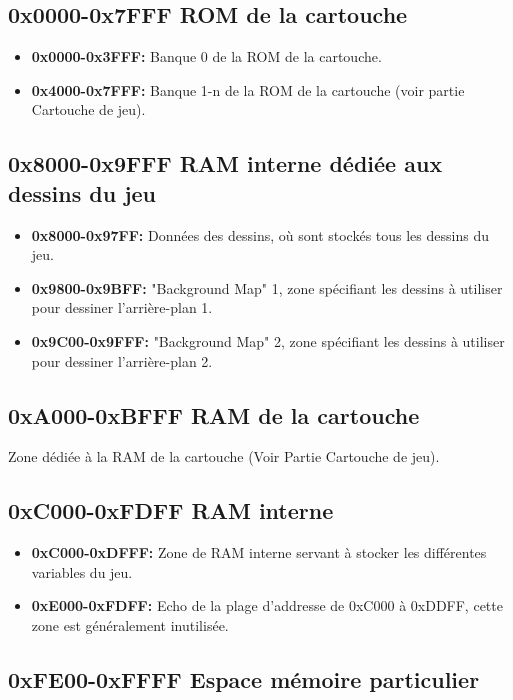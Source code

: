 \documentclass{report}
\begin{document}
\subsection{0x0000-0x7FFF ROM de la cartouche}
\begin{itemize}
\item \textbf{0x0000-0x3FFF:} Banque 0 de la ROM de la cartouche.
\item \textbf{0x4000-0x7FFF:} Banque 1-n de la ROM de la cartouche (voir partie Cartouche de jeu).
\end{itemize}

\subsection{0x8000-0x9FFF RAM interne dédiée aux dessins du jeu}
\begin{itemize}
\item \textbf{0x8000-0x97FF:} Données des dessins, où sont stockés tous les dessins du jeu.
\item \textbf{0x9800-0x9BFF:} "Background Map" 1, zone spécifiant les dessins à utiliser pour dessiner l'arrière-plan 1.
\item \textbf{0x9C00-0x9FFF:} "Background Map" 2, zone spécifiant les dessins à utiliser pour dessiner l'arrière-plan 2. 
\end{itemize} 

\subsection{0xA000-0xBFFF RAM de la cartouche}
Zone dédiée à la RAM de la cartouche (Voir Partie Cartouche de jeu).

\subsection{0xC000-0xFDFF RAM interne}
\begin{itemize}
\item \textbf{0xC000-0xDFFF:} Zone de RAM interne servant à stocker les différentes variables du jeu.
\item \textbf{0xE000-0xFDFF:} Echo de la plage d'addresse de 0xC000 à 0xDDFF, cette zone est
généralement inutilisée.
\end{itemize} 

\subsection{0xFE00-0xFFFF Espace mémoire particulier}
\end{document}
